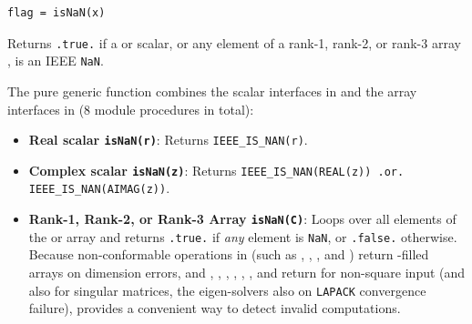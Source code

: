 
\lstset{language=[95]Fortran}
\begin{lstlisting}
flag = isNaN(x)
\end{lstlisting}

Returns \texttt{.true.} if a  or  scalar, or any element of a rank-1, rank-2, or rank-3 array , is an IEEE \texttt{NaN}.

The pure generic function  combines the scalar interfaces in  and the array interfaces in  (8 module procedures in total):
\begin{itemize}
  \item \textbf{Real scalar \texttt{isNaN(r)}}: Returns \texttt{IEEE\_IS\_NAN(r)}.
  \item \textbf{Complex scalar \texttt{isNaN(z)}}: Returns \texttt{IEEE\_IS\_NAN(REAL(z)) .or. IEEE\_IS\_NAN(AIMAG(z))}.
  \item \textbf{Rank-1, Rank-2, or Rank-3 Array \texttt{isNaN(C)}}: Loops over all elements of the  or  array  and returns \texttt{.true.} if \emph{any} element is \texttt{NaN}, or \texttt{.false.} otherwise. Because non-conformable operations in  (such as , , , and ) return -filled arrays on dimension errors, and , , , , , , and  return  for non-square input (and  also for singular matrices, the eigen-solvers also on \texttt{LAPACK} convergence failure),  provides a convenient way to detect invalid computations.
\end{itemize}

\begin{description}[leftmargin=2.2cm, style=nextline]
\end{description}


